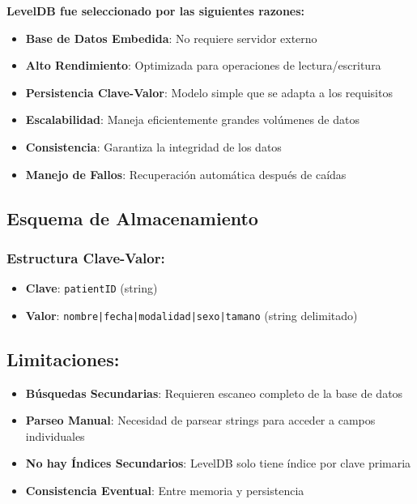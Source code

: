 \documentclass[12pt]{article}
\begin{document}
	
	\textbf{LevelDB fue seleccionado por las siguientes razones:}
	
	\begin{itemize}
		\item \textbf{Base de Datos Embedida}: No requiere servidor externo
		\item \textbf{Alto Rendimiento}: Optimizada para operaciones de lectura/escritura
		\item \textbf{Persistencia Clave-Valor}: Modelo simple que se adapta a los requisitos
		\item \textbf{Escalabilidad}: Maneja eficientemente grandes volúmenes de datos
		\item \textbf{Consistencia}: Garantiza la integridad de los datos
		\item \textbf{Manejo de Fallos}: Recuperación automática después de caídas
	\end{itemize}
	
	\subsection*{Esquema de Almacenamiento}
	
	\subsubsection*{Estructura Clave-Valor:}
	
	\begin{itemize}
		\item \textbf{Clave}: \texttt{patientID} (string)
		\item \textbf{Valor}: \texttt{nombre|fecha|modalidad|sexo|tamano} (string delimitado)
	\end{itemize}
	
	\subsection*{Limitaciones:}
	
	\begin{itemize}
		\item \textbf{Búsquedas Secundarias}: Requieren escaneo completo de la base de datos
		\item \textbf{Parseo Manual}: Necesidad de parsear strings para acceder a campos individuales
		\item \textbf{No hay Índices Secundarios}: LevelDB solo tiene índice por clave primaria
		\item \textbf{Consistencia Eventual}: Entre memoria y persistencia
	\end{itemize}
\end{document}
